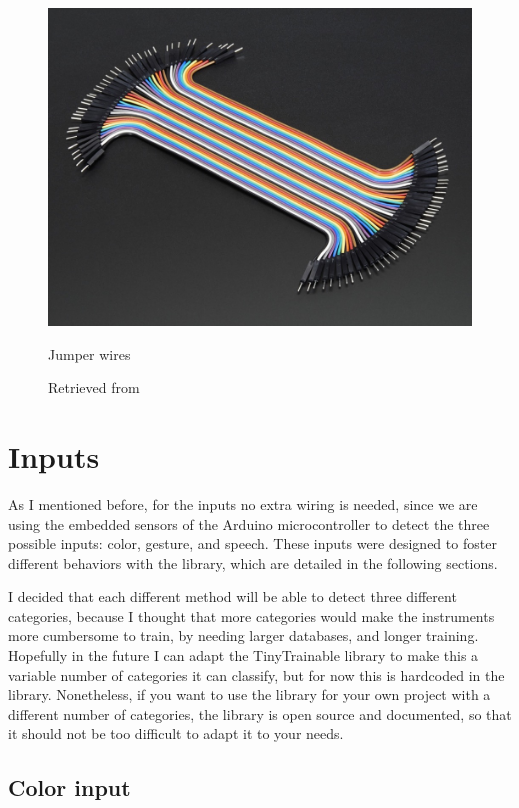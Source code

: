 \begin{figure}[ht]
  \centering
  \includegraphics[width=0.75\linewidth,height=0.25\textheight,keepaspectratio]{images/materials-adafruit-jumper-wires.jpg}
  \caption{Jumper wires}
  \caption*{Retrieved from \cite{website-materials-adafruit-jumper-wires}}
  \label{fig:materials-adafruit-jumper-wires}
\end{figure}

\section{Inputs}

As I mentioned before, for the inputs no extra wiring is needed, since we are using the embedded sensors of the Arduino microcontroller to detect the three possible inputs: color, gesture, and speech. These inputs were designed to foster different behaviors with the library, which are detailed in the following sections.

I decided that each different method will be able to detect three different categories, because I thought that more categories would make the instruments more cumbersome to train, by needing larger databases, and longer training. Hopefully in the future I can adapt the TinyTrainable library to make this a variable number of categories it can classify, but for now this is hardcoded in the library. Nonetheless, if you want to use the library for your own project with a different number of categories, the library is open source and documented, so that it should not be too difficult to adapt it to your needs.

\subsection{Color input}

